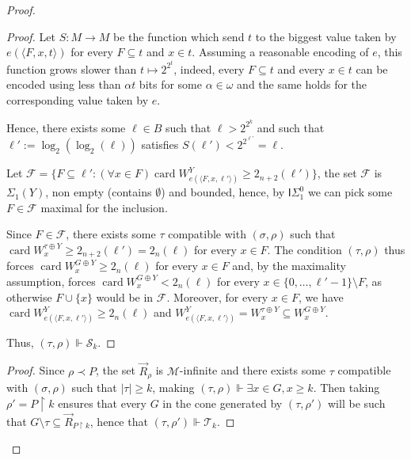 \documentclass{article}
\def\M{\mathcal{M}}
\def\T{\mathcal{T}}
\def\S{\mathcal{S}}
\newcommand{\uh}{\upharpoonright}
\newcommand{\ISig}{\mathsf{I}\Sigma^0}
\newcommand{\card}{\operatorname{card}}
\numberwithin{theorem}{section}
\newtheorem{lemma}[theorem]{Lemma}
\begin{document}
\begin{proof}
\begin{proof}
Let $S : M \to M$ be the function which send $t$ to the biggest value taken by $e(\langle F,x,t\rangle)$ for every $F \subseteq t$ and $x \in t$. Assuming a reasonable encoding of $e$, this function grows slower than $t \mapsto 2^{2^t}$, indeed, every $F \subseteq t$ and every $x \in t$ can be encoded using less than $\alpha t$ bits for some $\alpha \in \omega$ and the same holds for the corresponding value taken by $e$.

Hence, there exists some $\ell \in B$ such that $\ell > 2^{2^k}$ and such that $\ell' := \log_2(\log_2(\ell))$ satisfies $S(\ell') < 2^{2^{\ell'}} = \ell$.

Let $\mathcal{F} = \{ F \subseteq \ell' : (\forall x \in F) \card W_{e(\langle F, x, \ell' \rangle)}^Y \geq 2_{n+2}(\ell') \}$, the set $\mathcal{F}$ is $\Sigma_1(Y)$, non empty (contains $\emptyset$) and bounded, hence, by $\ISig_1$ we can pick some $F \in \mathcal{F}$ maximal for the inclusion. 

Since $F \in \mathcal{F}$, there exists some $\tau$ compatible with $(\sigma, \rho)$ such that $\card W^{\tau \oplus Y}_{x} \geq 2_{n+2}(\ell')  = 2_n(\ell)$ for every $x \in F$. The condition $(\tau, \rho)$ thus forces $\card W^{G \oplus Y}_{x} \geq 2_n(\ell)$ for every $x \in F$ and, by the maximality assumption, forces $\card W^{G \oplus Y}_{x} < 2_n(\ell)$ for every $x \in \{0, \dots, \ell'-1\} \setminus F$, as otherwise $F \cup \{x\}$ would be in $\mathcal{F}$. Moreover, for every $x \in F$, we have $\card W_{e(\langle F, x,\ell' \rangle)}^Y \geq 2_n(\ell)$ and $W_{e(\langle F, x,\ell' \rangle)}^Y = W^{\tau \oplus Y}_x \subseteq W^{G \oplus Y}_{x}$.

Thus, $(\tau, \rho) \Vdash \S_k$.
\end{proof}


\begin{proof}
Since $\rho \prec P$, the set $\vec{R}_{\rho}$ is $\M$-infinite and there exists some $\tau$ compatible with $(\sigma, \rho)$ such that $|\tau| \geq k$, making $(\tau, \rho) \Vdash \exists x \in G, x \geq k$. Then taking $\rho' = P \uh k$ ensures that every $G$ in the cone generated by $(\tau, \rho')$ will be such that $G \setminus \tau \subseteq \vec{R}_{P \uh k}$, hence that $(\tau, \rho') \Vdash \T_k$.
\end{proof}


\end{proof}
\end{document}
